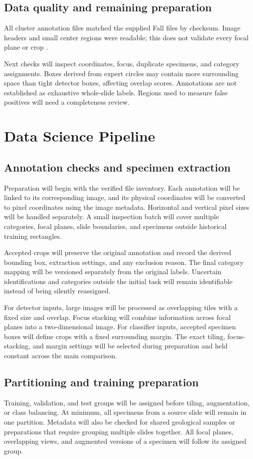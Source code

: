 \documentclass[conference,letterpaper]{IEEEtran}
\begin{document}
\subsection{Data quality and remaining preparation}
All \SlideCount{} cluster annotation files matched the supplied Fall files by checksum. Image headers and small center regions were readable; this does not validate every focal plane or crop \cite{inventory2026}.

Next checks will inspect coordinates, focus, duplicate specimens, and category assignments. Boxes derived from expert circles may contain more surrounding space than tight detector boxes, affecting overlap scores. Annotations are not established as exhaustive whole-slide labels. Regions used to measure false positives will need a completeness review.

\section{Data Science Pipeline}
\subsection{Annotation checks and specimen extraction}
Preparation will begin with the verified file inventory. Each annotation will be linked to its corresponding image, and its physical coordinates will be converted to pixel coordinates using the image metadata. Horizontal and vertical pixel sizes will be handled separately. A small inspection batch will cover multiple categories, focal planes, slide boundaries, and specimens outside historical training rectangles.

Accepted crops will preserve the original annotation and record the derived bounding box, extraction settings, and any exclusion reason. The final category mapping will be versioned separately from the original labels. Uncertain identifications and categories outside the initial task will remain identifiable instead of being silently reassigned.

For detector inputs, large images will be processed as overlapping tiles with a fixed size and overlap. Focus stacking will combine information across focal planes into a two-dimensional image. For classifier inputs, accepted specimen boxes will define crops with a fixed surrounding margin. The exact tiling, focus-stacking, and margin settings will be selected during preparation and held constant across the main comparison.

\subsection{Partitioning and training preparation}
Training, validation, and test groups will be assigned before tiling, augmentation, or class balancing. At minimum, all specimens from a source slide will remain in one partition. Metadata will also be checked for shared geological samples or preparations that require grouping multiple slides together. All focal planes, overlapping views, and augmented versions of a specimen will follow its assigned group.
\end{document}
